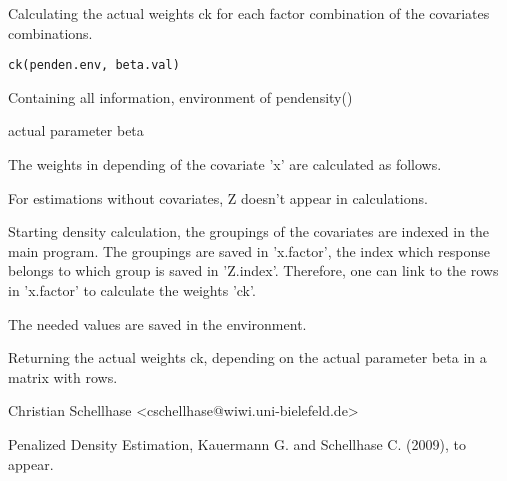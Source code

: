 \begin{Description}\relax
Calculating the actual weights ck for each factor combination of the covariates combinations.
\end{Description}
\begin{Usage}
\begin{verbatim}
ck(penden.env, beta.val)
\end{verbatim}
\end{Usage}
\begin{Arguments}
\begin{ldescription}
\item[\code{penden.env}] Containing all information, environment of pendensity()
\item[\code{beta.val}] actual parameter beta
\end{ldescription}
\end{Arguments}
\begin{Details}\relax
The weights in depending of the covariate 'x' are calculated as follows.


For estimations without covariates, Z doesn't appear in calculations.


Starting density calculation, the groupings of the covariates are
indexed in the main program. The groupings are saved in 'x.factor', the index which response
belongs to which group is saved in 'Z.index'. Therefore, one can link to
the rows in 'x.factor' to calculate the weights 'ck'. 

The needed values are saved in the environment.
\end{Details}
\begin{Value}
Returning the actual weights ck, depending on the actual parameter beta in a matrix with rows.
\end{Value}
\begin{Author}\relax
Christian Schellhase <cschellhase@wiwi.uni-bielefeld.de>
\end{Author}
\begin{References}\relax
Penalized Density Estimation, Kauermann G. and Schellhase C. (2009), to appear.
\end{References}

